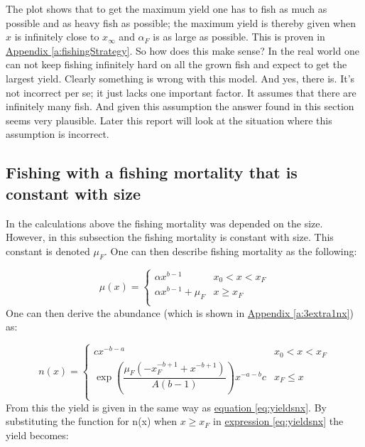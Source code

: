 \documentclass{article}
\numberwithin{equation}{section} %
\begin{document}
The plot shows that to get the maximum yield one has to fish as much as possible and as heavy fish as possible; the maximum yield is thereby given when $x$ is infinitely close to $x_\infty$ and $\alpha_F$ is as large as possible. This is proven in \hyperref[a:fishingStrategy]{Appendix \ref{a:fishingStrategy}}\label{jmp:a:fishingStrategy}. So how does this make sense? In the real world one can not keep fishing infinitely hard on all the grown fish and expect to get the largest yield. Clearly something is wrong with this model. And yes, there is. It's not incorrect per se; it just lacks one important factor. It assumes that there are infinitely many fish. And given this assumption the answer found in this section seems very plausible. Later this report will look at the situation where this assumption is incorrect. 

\subsection{Fishing with a fishing mortality that is constant with size}\label{sec:Ex3extra1}
In the calculations above the fishing mortality was depended on the size. However, in this subsection the fishing mortality is constant with size. This constant is denoted $\mu_F$. One can then describe fishing mortality as the following:

\begin{equation}
\mu(x) =
       \left\{
        \begin{array}{ll}
              \alpha x^{b-1} & x_0 < x < x_F \\
              \alpha x^{b-1}+\mu_F &  x\geq x_F \\
        \end{array} 
\right.
\end{equation}
One can then derive the abundance (which is shown in \hyperref[a:3extra1nx]{Appendix \ref{a:3extra1nx}})\label{jmp:a:3extra1nx} as:

\begin{equation}\label{eq:ex3extranx}
    n(x) =
       \left\{
        \begin{array}{ll}
              cx^{-b-a} & x_0 < x < x_F \\
              \exp\left(\dfrac{\mu_F\left(-x_F^{-b+1}+x^{-b+1}\right)}{A(b-1)}\right)x^{-a-b}c & x_F\leq x \\
        \end{array}
\right.
\end{equation}
From this the yield is given in the same way as \hyperref[eq:yieldsnx]{equation \ref{eq:yieldsnx}}. By substituting the function for n(x) when $x\geq x_F$  in \hyperref[eq:yieldsnx]{expression \ref{eq:yieldsnx}}  the yield becomes:
\end{document}
